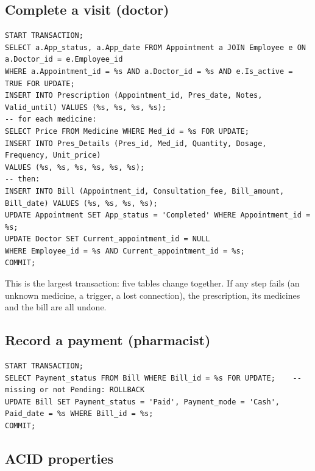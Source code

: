 \documentclass[11pt,a4paper]{article}
\begin{document}
\subsection{Complete a visit (doctor)}
\begin{lstlisting}[style=sql]
START TRANSACTION;
SELECT a.App_status, a.App_date FROM Appointment a JOIN Employee e ON a.Doctor_id = e.Employee_id
WHERE a.Appointment_id = %s AND a.Doctor_id = %s AND e.Is_active = TRUE FOR UPDATE;
INSERT INTO Prescription (Appointment_id, Pres_date, Notes, Valid_until) VALUES (%s, %s, %s, %s);
-- for each medicine:
SELECT Price FROM Medicine WHERE Med_id = %s FOR UPDATE;
INSERT INTO Pres_Details (Pres_id, Med_id, Quantity, Dosage, Frequency, Unit_price)
VALUES (%s, %s, %s, %s, %s, %s);
-- then:
INSERT INTO Bill (Appointment_id, Consultation_fee, Bill_amount, Bill_date) VALUES (%s, %s, %s, %s);
UPDATE Appointment SET App_status = 'Completed' WHERE Appointment_id = %s;
UPDATE Doctor SET Current_appointment_id = NULL
WHERE Employee_id = %s AND Current_appointment_id = %s;
COMMIT;
\end{lstlisting}
This is the largest transaction: five tables change together. If any step fails (an unknown medicine, a trigger, a lost connection), the prescription, its medicines and the bill are all undone.

\subsection{Record a payment (pharmacist)}
\begin{lstlisting}[style=sql]
START TRANSACTION;
SELECT Payment_status FROM Bill WHERE Bill_id = %s FOR UPDATE;    -- missing or not Pending: ROLLBACK
UPDATE Bill SET Payment_status = 'Paid', Payment_mode = 'Cash', Paid_date = %s WHERE Bill_id = %s;
COMMIT;
\end{lstlisting}

\subsection{ACID properties}
\end{document}
